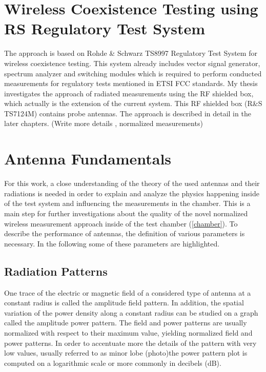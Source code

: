 \section{Wireless Coexistence Testing using \acs{RS}\textregistered{} Regulatory Test System}
The approach is based on Rohde \& Schwarz TS8997 Regulatory Test System for wireless coexistence testing. This system already includes vector signal generator, spectrum analyzer and switching modules which is required to perform conducted measurements for regulatory tests mentioned in ETSI FCC standards. My thesis investigates the approach of radiated measurements using the RF shielded box, which actually is the extension of the current system. This RF shielded box (R\&S TS7124M) contains probe antennas. The approach is described in detail in the later chapters.
  (Write more details , normalized measurements)


\section{Antenna Fundamentals}

For this work, a close understanding of the theory of the used antennas and their radiations is needed in order to explain and analyze the physics happening inside of the test system and influencing the measurements in the chamber. This is a main step for further investigations about the quality of the novel normalized wireless measurement approach inside of the test chamber (\ref{chamber}). To describe the performance of antennas, the definition of various parameters is necessary. In the following some of these parameters are highlighted.


\subsection{Radiation Patterns}

One trace of the electric or magnetic field of a considered type of antenna at a constant radius is called the amplitude field pattern. In addition, the spatial variation of the power density along a constant radius can be studied on a graph called the amplitude power pattern. The field and power patterns are usually normalized with respect to their maximum value, yielding normalized field and power patterns. In order to accentuate more the details of the pattern with very low values, usually referred to as minor lobe (photo)the power pattern plot is computed on a logarithmic scale or more commonly in decibels (dB).

